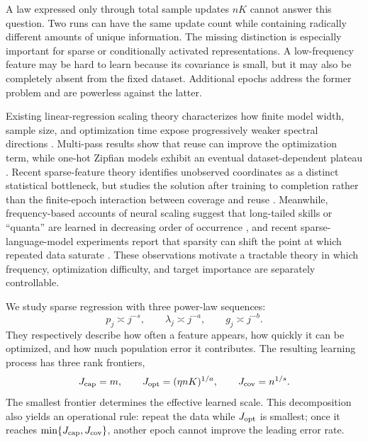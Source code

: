\documentclass[letterpaper]{article}
\begin{document}
A law expressed only through total sample updates $nK$ cannot answer this
question. Two runs can have the same update count while containing radically
different amounts of unique information. The missing distinction is especially
important for sparse or conditionally activated representations. A low-frequency
feature may be hard to learn because its covariance is small, but it may also be
completely absent from the fixed dataset. Additional epochs address the former
problem and are powerless against the latter.

Existing linear-regression scaling theory characterizes how finite model width,
sample size, and optimization time expose progressively weaker spectral
directions \cite{lin2024scaling,lin2025reuse,chen2026minibatch}. Multi-pass
results show that reuse can improve the optimization term, while one-hot
Zipfian models exhibit an eventual dataset-dependent plateau
\cite{zou2022multipass,yan2026larger}. Recent sparse-feature theory identifies
unobserved coordinates as a distinct statistical bottleneck, but studies the
solution after training to completion rather than the finite-epoch interaction
between coverage and reuse \cite{sous2026asymmetric}. Meanwhile, frequency-based
accounts of neural scaling suggest that long-tailed skills or ``quanta'' are
learned in decreasing order of occurrence \cite{michaud2023quantization}, and
recent sparse-language-model experiments report that sparsity can shift the
point at which repeated data saturate \cite{wu2026scarce}. These observations
motivate a tractable theory in which frequency, optimization difficulty, and
target importance are separately controllable.

We study sparse regression with three power-law sequences:
\[
p_j\asymp j^{-s},\qquad
\lambda_j\asymp j^{-a},\qquad
g_j\asymp j^{-b}.
\]
They respectively describe how often a feature appears, how quickly it can be
optimized, and how much population error it contributes. The resulting learning
process has three rank frontiers,
\begin{equation}
J_{\rm cap}=m,\qquad
J_{\rm opt}=(\eta nK)^{1/a},\qquad
J_{\rm cov}=n^{1/s}.
\label{eq:frontiers-intro}
\end{equation}
The smallest frontier determines the effective learned scale. This decomposition
also yields an operational rule: repeat the data while $J_{\rm opt}$ is smallest;
once it reaches $\min\{J_{\rm cap},J_{\rm cov}\}$, another epoch cannot improve
the leading error rate.
\end{document}

